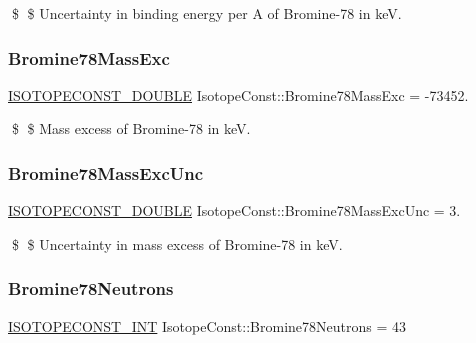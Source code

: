 \$ \$ Uncertainty in binding energy per A of Bromine-\/78 in keV. \mbox{\label{group___isotope_const-_bromine-_br78_ga63a7bde04aa8751da3a734dae041de24}} 
\subsubsection{\texorpdfstring{Bromine78\+Mass\+Exc}{Bromine78MassExc}}
{\footnotesize\ttfamily \mbox{\hyperlink{group___isotope_const-_macros_ga8f45a7272ce02c0b4c65c44636ed719a}{I\+S\+O\+T\+O\+P\+E\+C\+O\+N\+S\+T\+\_\+\+D\+O\+U\+B\+LE}} Isotope\+Const\+::\+Bromine78\+Mass\+Exc = -\/73452.}

\$ \$ Mass excess of Bromine-\/78 in keV. \mbox{\label{group___isotope_const-_bromine-_br78_ga41b9226f53c00e393574f0e2b51034e1}} 
\subsubsection{\texorpdfstring{Bromine78\+Mass\+Exc\+Unc}{Bromine78MassExcUnc}}
{\footnotesize\ttfamily \mbox{\hyperlink{group___isotope_const-_macros_ga8f45a7272ce02c0b4c65c44636ed719a}{I\+S\+O\+T\+O\+P\+E\+C\+O\+N\+S\+T\+\_\+\+D\+O\+U\+B\+LE}} Isotope\+Const\+::\+Bromine78\+Mass\+Exc\+Unc = 3.}

\$ \$ Uncertainty in mass excess of Bromine-\/78 in keV. \mbox{\label{group___isotope_const-_bromine-_br78_ga6197a51594150d9b354236b0b919bc49}} 
\subsubsection{\texorpdfstring{Bromine78\+Neutrons}{Bromine78Neutrons}}
{\footnotesize\ttfamily \mbox{\hyperlink{group___isotope_const-_macros_ga5f18360b3e99483a35c32d789e62621c}{I\+S\+O\+T\+O\+P\+E\+C\+O\+N\+S\+T\+\_\+\+I\+NT}} Isotope\+Const\+::\+Bromine78\+Neutrons = 43}

